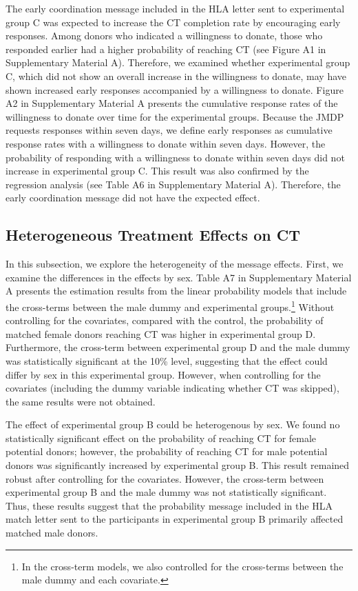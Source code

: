 \documentclass[12pt, a4paper]{article}
\begin{document}
The early coordination message included in the HLA letter sent to experimental group C was expected to increase the CT completion rate by encouraging early responses. Among donors who indicated a willingness to donate, those who responded earlier had a higher probability of reaching CT (see Figure A1 in Supplementary Material A). Therefore, we examined whether experimental group C, which did not show an overall increase in the willingness to donate, may have shown increased early responses accompanied by a willingness to donate. Figure A2 in Supplementary Material A presents the cumulative response rates of the willingness to donate over time for the experimental groups. Because the JMDP requests responses within seven days, we define early responses as cumulative response rates with a willingness to donate within seven days. However, the probability of responding with a willingness to donate within seven days did not increase in experimental group C. This result was also confirmed by the regression analysis (see Table A6 in Supplementary Material A). Therefore, the early coordination message did not have the expected effect.

\subsection{Heterogeneous Treatment Effects on CT}\label{heterogeneous-treatment-effects-on-ct}

In this subsection, we explore the heterogeneity of the message effects. First, we examine the differences in the effects by sex. Table A7 in Supplementary Material A presents the estimation results from the linear probability models that include the cross-terms between the male dummy and experimental groups.\footnote{In the cross-term models, we also controlled for the cross-terms between the male dummy and each covariate.} Without controlling for the covariates, compared with the control, the probability of matched female donors reaching CT was higher in experimental group D. Furthermore, the cross-term between experimental group D and the male dummy was statistically significant at the 10\% level, suggesting that the effect could differ by sex in this experimental group. However, when controlling for the covariates (including the dummy variable indicating whether CT was skipped), the same results were not obtained.

The effect of experimental group B could be heterogenous by sex. We found no statistically significant effect on the probability of reaching CT for female potential donors; however, the probability of reaching CT for male potential donors was significantly increased by experimental group B. This result remained robust after controlling for the covariates. However, the cross-term between experimental group B and the male dummy was not statistically significant. Thus, these results suggest that the probability message included in the HLA match letter sent to the participants in experimental group B primarily affected matched male donors.
\end{document}
